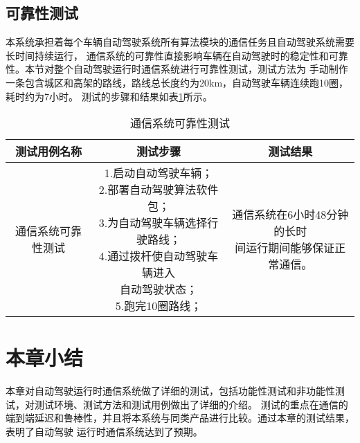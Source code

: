 \subsection{可靠性测试}
本系统承担着每个车辆自动驾驶系统所有算法模块的通信任务且自动驾驶系统需要长时间持续运行，
通信系统的可靠性直接影响车辆在自动驾驶时的稳定性和可靠性。本节对整个自动驾驶运行时通信系统进行可靠性测试，测试方法为
手动制作一条包含城区和高架的路线，路线总长度约为20km，自动驾驶车辆连续跑10圈，耗时约为7小时。
测试的步骤和结果如表\ref{system_reliable}所示。

\begin{table}[H]
  \centering\small
  \caption{通信系统可靠性测试}
  \renewcommand\arraystretch{1.2}
  \label{system_reliable}
  \begin{tabular}{ccc}
    \toprule
    测试用例名称 & 测试步骤 & 测试结果 \\
    \midrule
    通信系统可靠性测试 & \makecell[l]{1.启动自动驾驶车辆；\\2.部署自动驾驶算法软件包；\\3.为自动驾驶车辆选择行驶路线；\\4.通过拨杆使自动驾驶车辆进入\\自动驾驶状态；\\5.跑完10圈路线；} & \makecell[l]{通信系统在6小时48分钟的长时\\间运行期间能够保证正常通信。\\}\\
    \bottomrule
  \end{tabular}
\end{table}

\section{本章小结}
本章对自动驾驶运行时通信系统做了详细的测试，包括功能性测试和非功能性测试，对测试环境、测试方法和测试用例做出了详细的介绍。
测试的重点在通信的端到端延迟和鲁棒性，并且将本系统与同类产品进行比较。通过本章的测试结果，表明了自动驾驶
运行时通信系统达到了预期。

